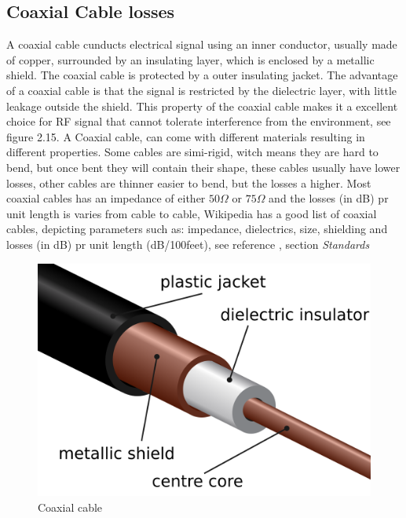\subsection{Coaxial Cable losses}
A coaxial cable cunducts electrical signal using an inner conductor, usually made of copper, surrounded by an insulating layer, which is enclosed by a metallic shield. The coaxial cable is protected by a outer insulating jacket. The advantage of a coaxial cable is that the signal is restricted by the dielectric layer, with little leakage outside the shield. This property of the coaxial cable makes it a excellent choice for RF signal that cannot tolerate interference from the environment\cite{CoaxialCable}, see figure 2.15. A Coaxial cable, can come with different materials resulting in different properties. Some cables are simi-rigid, witch means they are hard to bend, but once bent they will contain their shape, these cables usually have lower losses, other cables are thinner easier to bend, but the losses a higher. Most coaxial cables has an impedance of either $50\Omega$ or $75\Omega$ and the losses (in dB) pr unit length is varies from cable to cable, Wikipedia has a good list of coaxial cables, depicting parameters such as: impedance, dielectrics, size, shielding and losses (in dB) pr unit length (dB/100feet), see reference \cite{CoaxialCable}, section \textit{Standards}

\begin{figure}[h!]
\centering
\includegraphics[scale=0.15]{figures/CoaxialCable.png}
\caption{Coaxial cable\cite{CoaxialCable}}
\end{figure}

